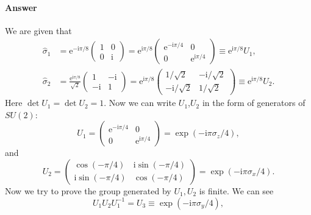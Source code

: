 \documentclass{book}
\begin{document}
\paragraph{Answer}
We are given that
\begin{equation*}
\begin{aligned}
\hat{\sigma }_{1} & =\mathrm{e}^{-\mathrm{i} \pi /8}\begin{pmatrix}
1 & 0\\
0 & \mathrm{i}
\end{pmatrix} =\mathrm{e}^{\mathrm{i} \pi /8}\begin{pmatrix}
\mathrm{e}^{-\mathrm{i} \pi /4} & 0\\
0 & \mathrm{e}^{\mathrm{i} \pi /4}
\end{pmatrix} \equiv \mathrm{e}^{\mathrm{i} \pi /8} U_{1} ,\\
\hat{\sigma }_{2} & =\frac{\mathrm{e}^{\mathrm{i} \pi /8}}{\sqrt{2}}\begin{pmatrix}
1 & -\mathrm{i}\\
-\mathrm{i} & 1
\end{pmatrix} =\mathrm{e}^{\mathrm{i} \pi /8}\begin{pmatrix}
1/\sqrt{2} & -\mathrm{i} /\sqrt{2}\\
-\mathrm{i} /\sqrt{2} & 1/\sqrt{2}
\end{pmatrix} \equiv \mathrm{e}^{\mathrm{i} \pi /8} U_{2} .
\end{aligned}
\end{equation*}
Here $\det U_{1} =\det U_{2} =1$. Now we can write $U_{1}$,$U_{2}$ in the form of generators of $SU( 2)$:
\begin{equation*}
U_{1} =\begin{pmatrix}
\mathrm{e}^{-\mathrm{i} \pi /4} & 0\\
0 & \mathrm{e}^{\mathrm{i} \pi /4}
\end{pmatrix} =\exp( -\mathrm{i} \pi \sigma _{z} /4) ,
\end{equation*}
and
\begin{equation*}
U_{2} =\begin{pmatrix}
\cos( -\pi /4) & \mathrm{i}\sin( -\pi /4)\\
\mathrm{i}\sin( -\pi /4) & \cos( -\pi /4)
\end{pmatrix} =\exp( -\mathrm{i} \pi \sigma _{x} /4) .
\end{equation*}
Now we try to prove the group generated by $U_{1} ,U_{2}$ is finite. We can see
\begin{equation*}
U_{1} U_{2} U_{1}^{-1} =U_{3} \equiv \exp( -\mathrm{i} \pi \sigma _{y} /4) ,
\end{equation*}
\end{document}
